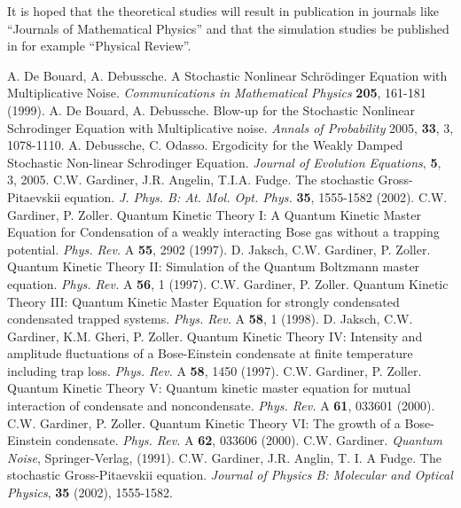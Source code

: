 \documentclass[a4paper,12pt,twoside]{article}
\begin{document}
  
It is hoped that the theoretical studies will result in publication in journals like ``Journals of Mathematical Physics'' and
that the simulation studies be published in for example  ``Physical Review''. 

\begin{thebibliography}{99}
 A. De Bouard, A. Debussche. A Stochastic Nonlinear Schr\"odinger Equation with Multiplicative Noise.
\emph{Communications in Mathematical Physics} {\bf 205}, 161-181 (1999). 
 A. De Bouard, A. Debussche. Blow-up for the Stochastic Nonlinear Schrodinger Equation with Multiplicative noise.
\emph{Annals of Probability} 2005, {\bf 33}, 3, 1078-1110.
A. Debussche, C. Odasso. Ergodicity for the Weakly Damped Stochastic Non-linear Schrodinger Equation.
\emph{Journal of Evolution Equations}, {\bf 5}, 3, 2005.
 C.W. Gardiner, J.R. Angelin, T.I.A. Fudge. The stochastic Gross-Pitaevskii equation.
\emph{J. Phys. B: At. Mol. Opt. Phys.} {\bf 35}, 1555-1582 (2002).  
 C.W. Gardiner, P. Zoller.  Quantum Kinetic Theory I: 
A Quantum Kinetic Master Equation for Condensation of a 
weakly interacting Bose gas without a trapping potential. \emph{Phys. Rev.} A {\bf 55}, 2902 (1997). 
 D. Jaksch, C.W. Gardiner, P. Zoller.  Quantum Kinetic Theory II: 
Simulation of the Quantum Boltzmann master equation. \emph{Phys. Rev.} A {\bf 56}, 1 (1997).
 C.W. Gardiner, P. Zoller.  Quantum Kinetic Theory III: 
Quantum Kinetic Master Equation for strongly condensated condensated trapped systems. 
\emph{Phys. Rev.} A {\bf 58}, 1 (1998).
 D. Jaksch, C.W. Gardiner, K.M. Gheri, P. Zoller.  Quantum Kinetic Theory IV: 
Intensity and amplitude fluctuations of a Bose-Einstein condensate at finite temperature including trap loss.
 \emph{Phys. Rev.} A {\bf 58}, 1450 (1997).
 C.W. Gardiner, P. Zoller.  Quantum Kinetic Theory V: 
Quantum kinetic master equation for mutual interaction of condensate and noncondensate. \emph{Phys. Rev.} A {\bf 61}, 033601 (2000).  
 C.W. Gardiner, P. Zoller.  Quantum Kinetic Theory VI: 
The growth of a Bose-Einstein condensate. \emph{Phys. Rev.} A {\bf 62}, 033606 (2000).  
 C.W. Gardiner. \emph{Quantum Noise}, Springer-Verlag, (1991).
 C.W. Gardiner, J.R. Anglin, T. I. A Fudge. The stochastic Gross-Pitaevskii equation. 
\emph{Journal of Physics B: Molecular and Optical Physics}, {\bf 35} (2002), 1555-1582.
\end{thebibliography}
\end{document}
